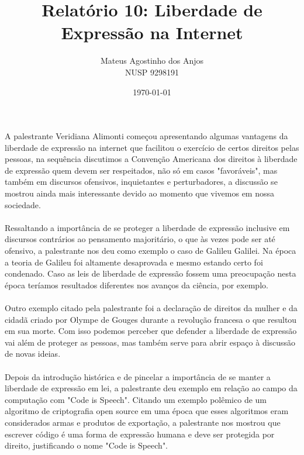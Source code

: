 \documentclass[12pt]{article}
\title{Relatório 10: Liberdade de Expressão na Internet}
\author{Mateus Agostinho dos Anjos\\NUSP 9298191}
\date{\today}
\begin{document}
	\maketitle
	\paragraph{}
		A palestrante Veridiana Alimonti começou apresentando algumas vantagens
		da liberdade de expressão na internet que facilitou o exercício de certos 
		direitos pelas pessoas, na sequência discutimos a Convenção Americana dos 
		direitos à liberdade de expressão quem devem ser respeitados, não só em casos
		"favoráveis", mas também em discursos ofensivos, inquietantes e perturbadores,
		a discussão se mostrou ainda mais interessante devido ao momento que vivemos
		em nossa sociedade.
	\paragraph{}
		Ressaltando a importância de se proteger a liberdade de expressão inclusive
		em discursos contrários ao pensamento majoritário, o que às vezes pode
		ser até ofensivo, a palestrante nos deu como exemplo o caso de Galileu Galilei.
		Na época a teoria de Galileu foi altamente desaprovada e mesmo estando certo
		foi condenado. Caso as leis de liberdade de expressão fossem uma preocupação
		nesta época teríamos resultados diferentes nos avanços da ciência, por exemplo.
	\paragraph{}
		Outro exemplo citado pela palestrante foi a	declaração de direitos da mulher e 
		da cidadã criado por Olympe de Gouges durante a revolução francesa o que 
		resultou em sua morte. Com isso podemos perceber que defender a liberdade
		de expressão vai além de proteger as pessoas, mas também serve para abrir
		espaço à discussão de novas ideias.
	\paragraph{}
		Depois da introdução histórica e de pincelar a importância de se manter
		a liberdade de expressão em lei, a palestrante deu exemplo em relação
		ao campo da computação com "Code is Speech". Citando um exemplo 
		polêmico de um algoritmo de criptografia open source em uma época que
		esses algoritmos eram considerados armas e produtos de exportação, a
		palestrante nos mostrou que escrever código é uma forma de expressão
		humana e deve ser protegida por direito, justificando o nome "Code is Speech".
\end{document}
